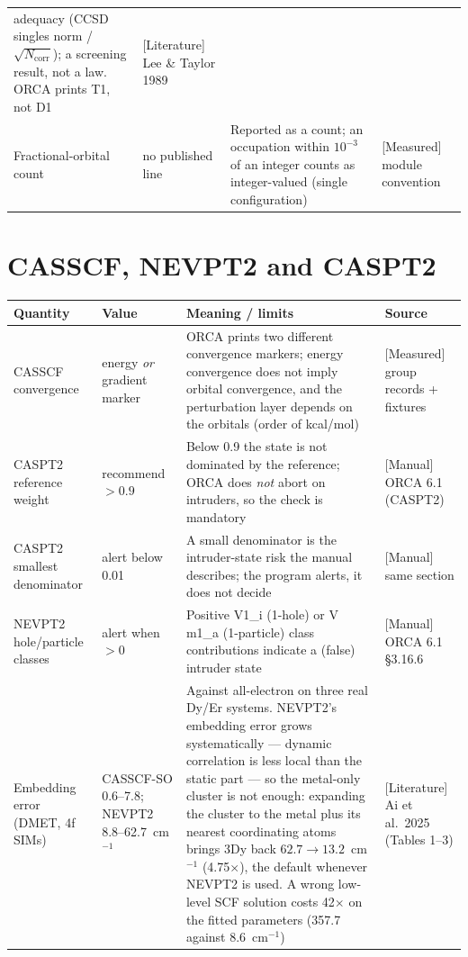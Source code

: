 \begin{center}
\begin{tabularx}{\textwidth}{@{}>{\raggedright\arraybackslash}p{3.2cm} >{\raggedright\arraybackslash}p{2.0cm} X >{\raggedright\arraybackslash}p{3.2cm}@{}}
  adequacy (CCSD singles norm / $\sqrt{N_{\text{corr}}}$); a screening result,
  not a law. ORCA prints T1, not D1 & \textsf{[Literature]} Lee \& Taylor 1989 \\
Fractional-orbital count & no published line & Reported as a count; an
  occupation within $10^{-3}$ of an integer counts as integer-valued (single
  configuration) & \textsf{[Measured]} module convention \\
\bottomrule
\end{tabularx}
\end{center}

\section{CASSCF, NEVPT2 and CASPT2}

\begin{center}
\begin{tabularx}{\textwidth}{@{}>{\raggedright\arraybackslash}p{3.2cm} >{\raggedright\arraybackslash}p{2.0cm} X >{\raggedright\arraybackslash}p{3.2cm}@{}}
\toprule
Quantity & Value & Meaning / limits & Source \\
\midrule
CASSCF convergence & energy \emph{or} gradient marker & ORCA prints two
  different convergence markers; energy convergence does not imply orbital
  convergence, and the perturbation layer depends on the orbitals (order of
  kcal/mol) & \textsf{[Measured]} group records + fixtures \\
CASPT2 reference weight & recommend $> 0.9$ & Below 0.9 the state is not
  dominated by the reference; ORCA does \emph{not} abort on intruders, so the
  check is mandatory & \textsf{[Manual]} ORCA 6.1 (CASPT2) \\
CASPT2 smallest denominator & alert below 0.01 & A small denominator is the
  intruder-state risk the manual describes; the program alerts, it does not
  decide & \textsf{[Manual]} same section \\
NEVPT2 hole/particle classes & alert when $> 0$ & Positive V1\_i (1-hole) or
  V m1\_a (1-particle) class contributions indicate a (false) intruder state &
  \textsf{[Manual]} ORCA 6.1 \S3.16.6 \\
Embedding error (DMET, 4f SIMs) & CASSCF-SO 0.6--7.8; NEVPT2 8.8--62.7~cm$^{-1}$
  & Against all-electron on three real Dy/Er systems. NEVPT2's embedding error
  grows systematically --- dynamic correlation is less local than the static
  part --- so the metal-only cluster is not enough: expanding the cluster to the
  metal plus its nearest coordinating atoms brings 3Dy back $62.7 \to
  13.2$~cm$^{-1}$ (4.75$\times$), the default whenever NEVPT2 is used. A wrong
  low-level SCF solution costs 42$\times$ on the fitted parameters (357.7
  against 8.6~cm$^{-1}$) & \textsf{[Literature]} Ai et al.\ 2025 (Tables 1--3) \\
\bottomrule
\end{tabularx}
\end{center}

